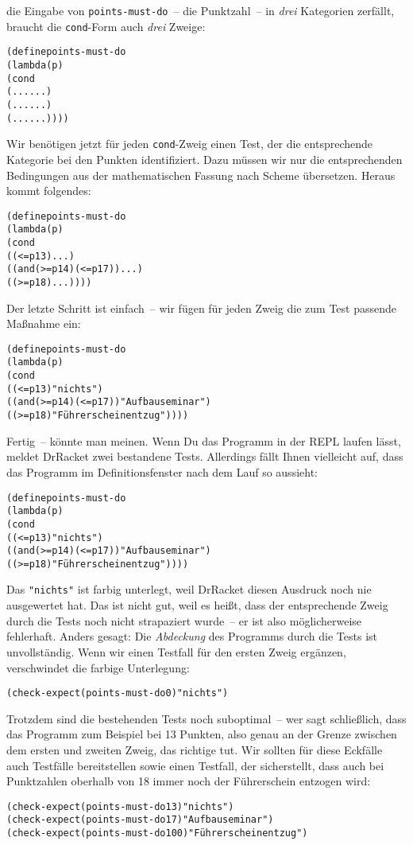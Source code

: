 die Eingabe von \texttt{points-must-do}~-- die Punktzahl~-- in
\emph{drei} Kategorien zerfällt, braucht die \texttt{cond}-Form auch
\emph{drei} Zweige:
%
\begin{alltt}
(define points-must-do
  (lambda (p)
    (cond
      (... ...)
      (... ...)
      (... ...))))
\end{alltt}
%
Wir benötigen jetzt für jeden \texttt{cond}-Zweig einen Test, der die
entsprechende Kategorie bei den Punkten identifiziert.  Dazu müssen
wir nur die entsprechenden Bedingungen aus der mathematischen Fassung
nach Scheme übersetzen.  Heraus kommt folgendes:
%
\begin{alltt}
(define points-must-do
  (lambda (p)
    (cond
      ((<= p 13) ...)
      ((and (>= p 14) (<= p 17)) ...)
      ((>= p 18) ...))))
\end{alltt}
%
Der letzte Schritt ist einfach~-- wir fügen für jeden Zweig die zum
Test passende Maßnahme ein:
%
\begin{alltt}
(define points-must-do
  (lambda (p)
    (cond
      ((<= p 13) "nichts")
      ((and (>= p 14) (<= p 17)) "Aufbauseminar")
      ((>= p 18) "Führerscheinentzug"))))
\end{alltt}
%
Fertig~-- könnte man meinen.  Wenn Du das Programm in der REPL laufen lässt,
meldet DrRacket zwei bestandene Tests.  Allerdings fällt Ihnen
vielleicht auf, dass das Programm im Definitionsfenster nach dem Lauf
so aussieht:
%
\begin{alltt}
(define points-must-do
  (lambda (p)
    (cond
      ((<= p 13) \colorbox{featuregray}{"nichts"})
      ((and (>= p 14) (<= p 17)) "Aufbauseminar")
      ((>= p 18) "Führerscheinentzug"))))
\end{alltt}
%
Das \verb|"nichts"| ist farbig unterlegt, weil DrRacket diesen
Ausdruck noch nie ausgewertet hat.  Das ist nicht gut, weil es heißt,
dass der entsprechende Zweig durch die Tests noch nicht strapaziert
wurde~-- er ist also möglicherweise fehlerhaft.  Anders gesagt: Die
\textit{Abdeckung} des Programms durch die Tests ist
unvollständig.  Wenn wir einen Testfall für den ersten Zweig ergänzen,
verschwindet die farbige Unterlegung:
%
\begin{alltt}
(check-expect (points-must-do 0) "nichts")
\end{alltt}
%
Trotzdem sind die bestehenden Tests noch suboptimal~-- wer sagt
schließlich, dass das Programm zum Beispiel bei 13 Punkten, also genau
an der Grenze zwischen dem ersten und zweiten Zweig, das richtige tut.
Wir sollten für diese Eckfälle auch Testfälle
bereitstellen sowie einen Testfall, der sicherstellt, dass auch bei
Punktzahlen oberhalb von 18 immer noch der Führerschein entzogen wird:
%
\begin{alltt}
(check-expect (points-must-do 13) "nichts")
(check-expect (points-must-do 17) "Aufbauseminar")
(check-expect (points-must-do 100) "Führerscheinentzug")
\end{alltt}

